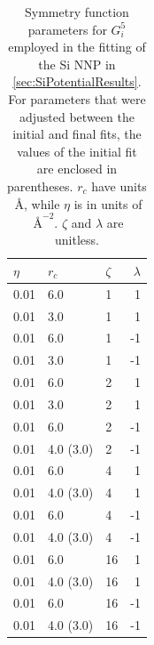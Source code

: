 \documentclass[twoside,english]{uiofysmaster}
\begin{document}
\begin{appendices}
\begin{table}[h] 
  \begin{center}
    \begin{tabular*}{8cm}{l @{\extracolsep{\fill}} llr}
      \toprule
      $\eta$ & $r_c$ & $\zeta$ & $\lambda$\\ 
      \hline
      0.01 & 6.0 & 1 & 1 \\
      0.01 & 3.0 & 1 & 1 \\ 
      0.01 & 6.0 & 1 & -1 \\ 
      0.01 & 3.0 & 1 & -1 \\
      0.01 & 6.0 & 2 & 1 \\
      0.01 & 3.0 & 2 & 1 \\
      0.01 & 6.0 & 2 & -1 \\
      0.01 & 4.0 (3.0) & 2 & -1 \\
      0.01 & 6.0 & 4 & 1 \\
      0.01 & 4.0 (3.0) & 4 & 1 \\
      0.01 & 6.0 & 4 & -1 \\
      0.01 & 4.0 (3.0) & 4 & -1 \\
      0.01 & 6.0 & 16 & 1 \\
      0.01 & 4.0 (3.0) & 16 & 1 \\
      0.01 & 6.0 & 16 & -1 \\
      0.01 & 4.0 (3.0) & 16 & -1 \\
      \bottomrule
      \end{tabular*} 
    \end{center}
    \captionsetup{width=12cm}
      \caption{Symmetry function parameters for $G_i^5$ employed in the fitting of the Si NNP in 
               \autoref{sec:SiPotentialResults}. For parameters that were adjusted between the initial and final fits, 
               the values of the initial fit are enclosed in parentheses. $r_c$ have units $\SI{}{\angstrom}$, while
               $\eta$ is in units of $\SI{}{\angstrom}^{-2}$. $\zeta$ and $\lambda$ are unitless. } 
  \label{tab:symmParamsInitialG5} 
\end{table}



\end{appendices}





\newpage
\end{document}
